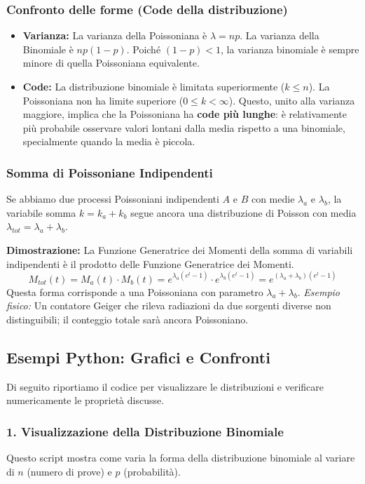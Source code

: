 \documentclass[openany,a4paper,12pt]{book}
\theoremstyle{remark}
\begin{document}
\subsubsection{Confronto delle forme (Code della distribuzione)}
\begin{itemize}
    \item \textbf{Varianza:} La varianza della Poissoniana è $\lambda = np$. La varianza della Binomiale è $np(1-p)$.
    Poiché $(1-p) < 1$, la varianza binomiale è sempre minore di quella Poissoniana equivalente.
    \item \textbf{Code:} La distribuzione binomiale è limitata superiormente ($k \le n$). La Poissoniana non ha limite superiore ($0 \le k < \infty$). Questo, unito alla varianza maggiore, implica che la Poissoniana ha \textbf{code più lunghe}: è relativamente più probabile osservare valori lontani dalla media rispetto a una binomiale, specialmente quando la media è piccola.
\end{itemize}

\subsubsection{Somma di Poissoniane Indipendenti}
Se abbiamo due processi Poissoniani indipendenti $A$ e $B$ con medie $\lambda_a$ e $\lambda_b$, la variabile somma $k = k_a + k_b$ segue ancora una distribuzione di Poisson con media $\lambda_{tot} = \lambda_a + \lambda_b$.

\textbf{Dimostrazione:} La Funzione Generatrice dei Momenti della somma di variabili indipendenti è il prodotto delle Funzione Generatrice dei Momenti.
\[
M_{tot}(t) = M_a(t) \cdot M_b(t) = e^{\lambda_a(e^t - 1)} \cdot e^{\lambda_b(e^t - 1)} = e^{(\lambda_a + \lambda_b)(e^t - 1)}
\]
Questa forma corrisponde a una Poissoniana con parametro $\lambda_a + \lambda_b$.
\textit{Esempio fisico:} Un contatore Geiger che rileva radiazioni da due sorgenti diverse non distinguibili; il conteggio totale sarà ancora Poissoniano.

\subsection*{Esempi Python: Grafici e Confronti}

Di seguito riportiamo il codice per visualizzare le distribuzioni e verificare numericamente le proprietà discusse.

\subsubsection*{1. Visualizzazione della Distribuzione Binomiale}
Questo script mostra come varia la forma della distribuzione binomiale al variare di $n$ (numero di prove) e $p$ (probabilità).
\end{document}
